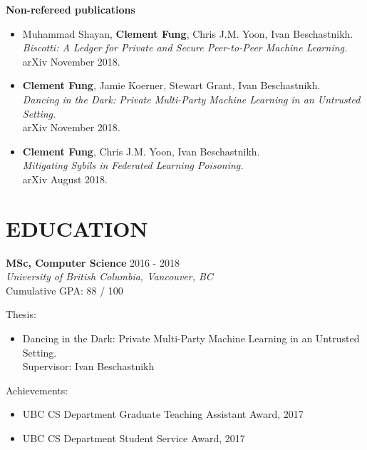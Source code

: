 \documentclass[10pt]{res} %
\begin{document}
\textbf{Non-refereed publications} 
\begin{itemize}
\item Muhammad Shayan, \textbf{Clement Fung}, Chris J.M. Yoon, Ivan Beschastnikh. \\
\emph{Biscotti: A Ledger for Private and Secure Peer-to-Peer Machine Learning.} \\ 
arXiv November 2018.
%
\item \textbf{Clement Fung}, Jamie Koerner, Stewart Grant, Ivan Beschastnikh. \\
\emph{Dancing in the Dark: Private Multi-Party Machine Learning in an
Untrusted Setting.} \\ 
arXiv November 2018.
%
\item \textbf{Clement Fung}, Chris J.M. Yoon, Ivan Beschastnikh. \\
\emph{Mitigating Sybils in Federated Learning Poisoning.} \\ 
arXiv August 2018.
\end{itemize}


\section{EDUCATION} 

\vspace{0.2in} %


\textbf {MSc, Computer Science} \hfill 2016 - 2018 \\ 
{\sl University of British Columbia, Vancouver, BC} \\
Cumulative GPA: 88 / 100

Thesis:
\begin{itemize} 
    \item Dancing in the Dark: Private Multi-Party Machine Learning in an Untrusted Setting. \\
    Supervisor: Ivan Beschastnikh
\end{itemize}

Achievements:
\begin{itemize} 
    \item UBC CS Department Graduate Teaching Assistant Award, 2017
    \item UBC CS Department Student Service Award, 2017
\end{itemize}
\end{document}

